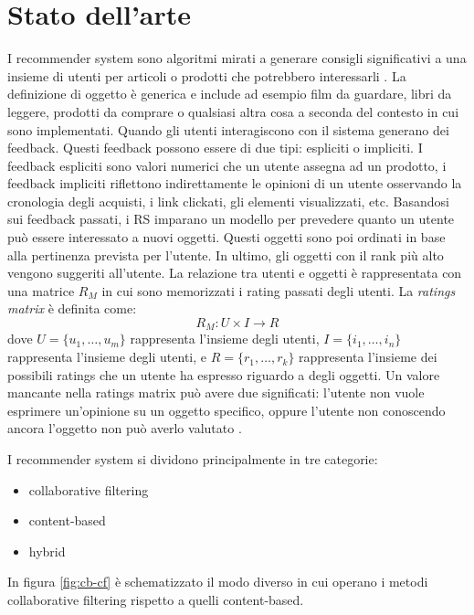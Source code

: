 \documentclass[12pt,italian]{report}
\begin{document}
\chapter{Stato dell'arte}
\label{chap:stato_arte}
I recommender system sono algoritmi mirati a generare consigli significativi a una insieme di utenti per articoli o prodotti che potrebbero interessarli \cite{recsys-definition}. La definizione di oggetto è generica e include ad esempio film da guardare, libri da leggere, prodotti da comprare o qualsiasi altra cosa a seconda del contesto in cui sono implementati. 
Quando gli utenti interagiscono con il sistema generano dei feedback. Questi feedback possono essere di due tipi: espliciti o impliciti. I feedback espliciti sono valori numerici che un utente assegna ad un prodotto, i feedback impliciti riflettono indirettamente le opinioni di un utente osservando la cronologia degli acquisti, i link clickati, gli elementi visualizzati, etc.
Basandosi sui feedback passati, i RS imparano un modello per prevedere quanto un utente può essere interessato a nuovi oggetti. Questi oggetti sono poi ordinati in base alla pertinenza prevista per l'utente. In ultimo, gli oggetti con il rank più alto vengono suggeriti all'utente. La relazione tra utenti e oggetti è rappresentata con una matrice $R_M$ in cui sono memorizzati i rating passati degli utenti.
La \textit{ratings matrix} è definita come: 
$$
R_M: U \times I \rightarrow R
$$
dove $U = \{u_1, \dots, u_m\}$ rappresenta l'insieme degli utenti, $I = \{i_1,\dots, i_n\}$ rappresenta l'insieme degli utenti, e $R = \{r_1, \dots, r_k\}$ rappresenta l'insieme dei possibili ratings che un utente ha espresso riguardo a degli oggetti. Un valore mancante nella ratings matrix può avere due significati: l'utente non vuole esprimere un'opinione su un oggetto specifico, oppure l'utente non conoscendo ancora l'oggetto non può averlo valutato \cite{survey-mattia}.

\vspace{5mm}
\noindent I recommender system si dividono principalmente in tre categorie:
\begin{itemize}
	\item collaborative filtering
	\item content-based
	\item hybrid
\end{itemize}

\noindent In figura \autoref{fig:cb-cf} è schematizzato il modo diverso in cui operano i metodi collaborative filtering rispetto a quelli content-based.
\end{document}
